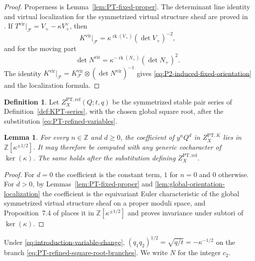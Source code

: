 \documentclass{amsart}
\newtheorem{lemma}{Lemma}
\theoremstyle{definition}
\newtheorem{definition}{Definition}
\numberwithin{equation}{section}
\newcommand{\Z}{\mathbb Z}
\newcommand{\rk}{\operatorname{rk}}
\begin{document}
\begin{proof}
Properness is Lemma~\ref{lem:PT-fixed-proper}.  The determinant line identity and virtual localization for the symmetrized virtual structure sheaf are proved in \cite[Section~7]{NekrasovOkounkov}.  If \(T^{\mathrm{vir}}|_{\mathscr F}=V_+-\kappa V_+^\vee\), then
\[
 K^{\mathrm{vir}}|_{\mathscr F}
 =\kappa^{\rk(V_+)}(\det V_+)^{-2},
\]
and for the moving part
\[
 \det N^{\mathrm{vir}}
 =\kappa^{-\rk(N_+)}(\det N_+)^2.
\]
The identity \(K^{\mathrm{vir}}|_{\mathscr F}=K_{\mathscr F}^{\mathrm{vir}} \otimes(\det N^{\mathrm{vir}})^{-1}\) gives \eqref{eq:P2-induced-fixed-orientation} and the localization formula.
\end{proof}

\begin{definition}
\label{def:PT-refined-series}
Let \(Z_X^{\mathrm{PT},\mathrm{ref}}(Q;t,q)\) be the symmetrized stable pair series of Definition~\ref{def:KPT-series}, with the chosen global square root, after the substitution \eqref{eq:PT-refined-variables}.
\end{definition}

\begin{lemma}
\label{lem:P2-kappa-rigidity}
For every \(n\in\Z\) and \(d\geq0\), the coefficient of \(y^nQ^d\) in \(Z_X^{\mathrm{PT},K}\) lies in \(\Z[\kappa^{\pm1/2}]\).  It may therefore be computed with any generic cocharacter of \(\ker(\kappa)\).  The same holds after the substitution defining \(Z_X^{\mathrm{PT},\mathrm{ref}}\).
\end{lemma}

\begin{proof}
For \(d=0\) the coefficient is the constant term, \(1\) for \(n=0\) and \(0\) otherwise.  For \(d>0\), by Lemmas~\ref{lem:PT-fixed-proper} and \ref{lem:global-orientation-localization} the coefficient is the equivariant Euler characteristic of the global symmetrized virtual structure sheaf on a proper moduli space, and Proposition~7.4 of \cite{NekrasovOkounkov} places it in \(\Z[\kappa^{\pm1/2}]\) and proves invariance under subtori of \(\ker(\kappa)\).
\end{proof}

Under \eqref{eq:introduction-variable-change}, \((q_1q_2)^{1/2}=\sqrt{q/t}=-\kappa^{-1/2}\) on the branch \eqref{eq:PT-refined-square-root-branches}.  We write \(N\) for the integer \(c_2\).
\end{document}
